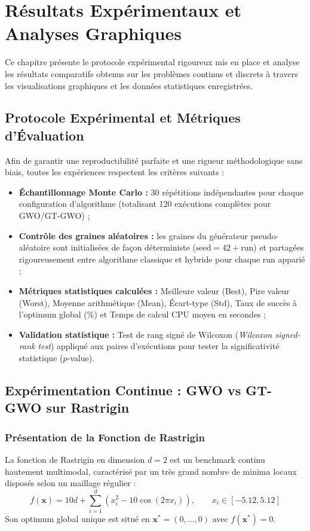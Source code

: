 \chapter{Résultats Expérimentaux et Analyses Graphiques}
\label{chap:resultats}

Ce chapitre présente le protocole expérimental rigoureux mis en place et analyse les résultats comparatifs obtenus sur les problèmes continus et discrets à travers les visualisations graphiques et les données statistiques enregistrées.

\section{Protocole Expérimental et Métriques d'Évaluation}
Afin de garantir une reproductibilité parfaite et une rigueur méthodologique sans biais, toutes les expériences respectent les critères suivants :
\begin{itemize}[label=\textbullet]
    \item \textbf{Échantillonnage Monte Carlo :} 30 répétitions indépendantes pour chaque configuration d'algorithme (totalisant 120 exécutions complètes pour GWO/GT-GWO) ;
    \item \textbf{Contrôle des graines aléatoires :} les graines du générateur pseudo-aléatoire sont initialisées de façon déterministe ($\text{seed} = 42 + \text{run}$) et partagées rigoureusement entre algorithme classique et hybride pour chaque run apparié ;
    \item \textbf{Métriques statistiques calculées :} Meilleure valeur (Best), Pire valeur (Worst), Moyenne arithmétique (Mean), Écart-type (Std), Taux de succès à l'optimum global ($\%$) et Temps de calcul CPU moyen en secondes ;
    \item \textbf{Validation statistique :} Test de rang signé de Wilcoxon (\textit{Wilcoxon signed-rank test}) appliqué aux paires d'exécutions pour tester la significativité statistique ($p$-value).
\end{itemize}

\section{Expérimentation Continue : GWO vs GT-GWO sur Rastrigin}

\subsection{Présentation de la Fonction de Rastrigin}
La fonction de Rastrigin en dimension $d = 2$ est un benchmark continu hautement multimodal, caractérisé par un très grand nombre de minima locaux disposés selon un maillage régulier :
\begin{equation}
    f(\mathbf{x}) = 10d + \sum_{i=1}^d \left(x_i^2 - 10 \cos(2\pi x_i)\right), \qquad x_i \in [-5.12, 5.12]
\end{equation}
Son optimum global unique est situé en $\mathbf{x}^* = (0, \dots, 0)$ avec $f(\mathbf{x}^*) = 0$.

